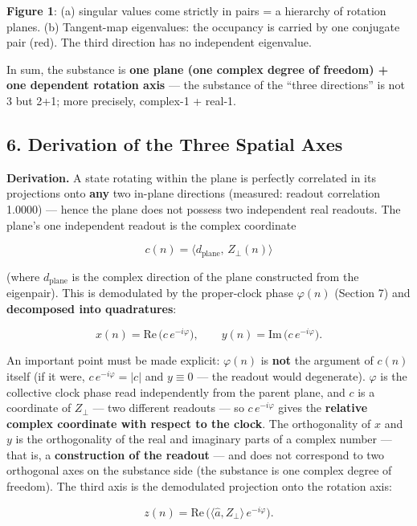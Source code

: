 \documentclass[
  a4paper,
]{article}
\begin{document}
\textbf{Figure 1}: (a) singular values come strictly in pairs = a
hierarchy of rotation planes. (b) Tangent-map eigenvalues: the occupancy
is carried by one conjugate pair (red). The third direction has no
independent eigenvalue.

In sum, the substance is \textbf{one plane (one complex degree of
freedom) + one dependent rotation axis} --- the substance of the ``three
directions'' is not 3 but 2+1; more precisely, complex-1 + real-1.

\subsection{6. Derivation of the Three Spatial
Axes}\label{derivation-of-the-three-spatial-axes}

\textbf{Derivation.} A state rotating within the plane is perfectly
correlated in its projections onto \textbf{any} two in-plane directions
(measured: readout correlation 1.0000) --- hence the plane does not
possess two independent real readouts. The plane's one independent
readout is the complex coordinate

\[c(n) = \langle d_{\text{plane}},\, Z_\perp(n)\rangle\]

(where \(d_{\text{plane}}\) is the complex direction of the plane
constructed from the eigenpair). This is demodulated by the proper-clock
phase \(\varphi(n)\) (Section 7) and \textbf{decomposed into
quadratures}:

\[x(n) = \mathrm{Re}\,\big(c\,e^{-i\varphi}\big), \qquad y(n) = \mathrm{Im}\,\big(c\,e^{-i\varphi}\big).\]

An important point must be made explicit: \(\varphi(n)\) is \textbf{not}
the argument of \(c(n)\) itself (if it were, \(c\,e^{-i\varphi}=|c|\)
and \(y\equiv0\) --- the readout would degenerate). \(\varphi\) is the
collective clock phase read independently from the parent plane, and
\(c\) is a coordinate of \(Z_\perp\) --- two different readouts --- so
\(c\,e^{-i\varphi}\) gives the \textbf{relative complex coordinate with
respect to the clock}. The orthogonality of \(x\) and \(y\) is the
orthogonality of the real and imaginary parts of a complex number ---
that is, a \textbf{construction of the readout} --- and does not
correspond to two orthogonal axes on the substance side (the substance
is one complex degree of freedom). The third axis is the demodulated
projection onto the rotation axis:

\[z(n) = \mathrm{Re}\,\big(\langle \hat a, Z_\perp\rangle\, e^{-i\varphi}\big).\]
\end{document}
